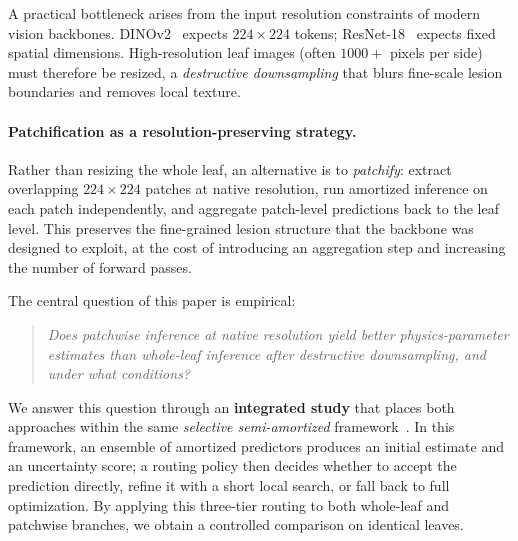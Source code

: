 \documentclass[11pt]{article}
\begin{document}
A practical bottleneck arises from the input resolution constraints of modern vision backbones.  DINOv2~\citep{oquab2024dinov2} expects $224{\times}224$ tokens; ResNet-18~\citep{he2016deep} expects fixed spatial dimensions.  High-resolution leaf images (often $1000{+}$ pixels per side) must therefore be resized, a \emph{destructive downsampling} that blurs fine-scale lesion boundaries and removes local texture.

\paragraph{Patchification as a resolution-preserving strategy.}
Rather than resizing the whole leaf, an alternative is to \emph{patchify}: extract overlapping $224{\times}224$ patches at native resolution, run amortized inference on each patch independently, and aggregate patch-level predictions back to the leaf level.  This preserves the fine-grained lesion structure that the backbone was designed to exploit, at the cost of introducing an aggregation step and increasing the number of forward passes.

The central question of this paper is empirical:
\begin{quote}
\emph{Does patchwise inference at native resolution yield better physics-parameter estimates than whole-leaf inference after destructive downsampling, and under what conditions?}
\end{quote}

We answer this question through an \textbf{integrated study} that places both approaches within the same \emph{selective semi-amortized} framework~\citep{kim2018semi,marino2018iterative}.  In this framework, an ensemble of amortized predictors produces an initial estimate and an uncertainty score; a routing policy then decides whether to accept the prediction directly, refine it with a short local search, or fall back to full optimization.  By applying this three-tier routing to both whole-leaf and patchwise branches, we obtain a controlled comparison on identical leaves.
\end{document}
